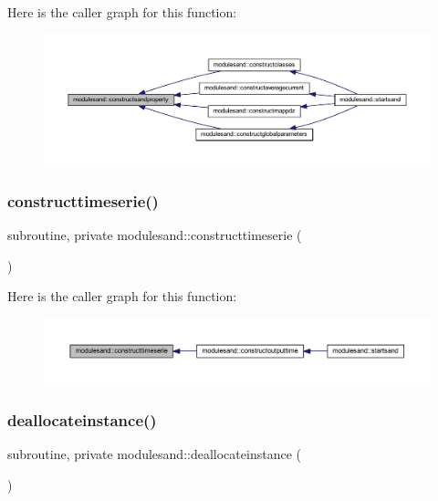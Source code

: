 Here is the caller graph for this function\+:\nopagebreak
\begin{figure}[H]
\begin{center}
\leavevmode
\includegraphics[width=350pt]{namespacemodulesand_a04230d24a80d765152f92115bc61d5c4_icgraph}
\end{center}
\end{figure}
\mbox{\label{namespacemodulesand_a32501716978e666f3e0a16150986c209}} 
\subsubsection{\texorpdfstring{constructtimeserie()}{constructtimeserie()}}
{\footnotesize\ttfamily subroutine, private modulesand\+::constructtimeserie (\begin{DoxyParamCaption}{ }\end{DoxyParamCaption})\hspace{0.3cm}{\ttfamily [private]}}

Here is the caller graph for this function\+:\nopagebreak
\begin{figure}[H]
\begin{center}
\leavevmode
\includegraphics[width=350pt]{namespacemodulesand_a32501716978e666f3e0a16150986c209_icgraph}
\end{center}
\end{figure}
\mbox{\label{namespacemodulesand_afe6b0604957817eebf137ff6997e6351}} 
\subsubsection{\texorpdfstring{deallocateinstance()}{deallocateinstance()}}
{\footnotesize\ttfamily subroutine, private modulesand\+::deallocateinstance (\begin{DoxyParamCaption}{ }\end{DoxyParamCaption})\hspace{0.3cm}{\ttfamily [private]}}

